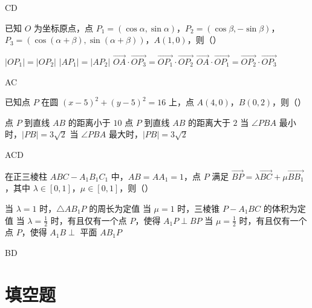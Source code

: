 \begin{answer}
CD
\end{answer}

\begin{problem}
已知 \(O\) 为坐标原点，点 \(P_1=\left( \cos\alpha,\sin\alpha \right)\)，\(P_2=\left( \cos\beta,-\sin\beta \right)\)，\(P_3=\left( \cos\left( \alpha+\beta \right),\sin\left( \alpha+\beta \right) \right)\)，\(A(1,0)\)，则（\quad）

\choices
    {\(|OP_1|=|OP_2|\)}
    {\(|AP_1|=|AP_2|\)}
    {\(\overrightarrow{OA}\cdot\overrightarrow{OP_3}=\overrightarrow{OP_1}\cdot\overrightarrow{OP_2}\)}
    {\(\overrightarrow{OA}\cdot\overrightarrow{OP_1}=\overrightarrow{OP_2}\cdot\overrightarrow{OP_3}\)}
\end{problem}

\begin{answer}
AC
\end{answer}

\begin{problem}
已知点 \(P\) 在圆 \(\left( x-5 \right)^2+\left( y-5 \right)^2=16\) 上，点 \(A(4,0)\)，\(B(0,2)\)，则（\quad）

\choices
    {点 \(P\) 到直线 \(AB\) 的距离小于 \(10\)}
    {点 \(P\) 到直线 \(AB\) 的距离大于 \(2\)}
    {当 \(\angle PBA\) 最小时，\(|PB|=3\sqrt{2}\)}
    {当 \(\angle PBA\) 最大时，\(|PB|=3\sqrt{2}\)}
\end{problem}

\begin{answer}
ACD
\end{answer}

\begin{problem}
在正三棱柱 \(ABC-A_1B_1C_1\) 中，\(AB=AA_1=1\)，点 \(P\) 满足 \(\overrightarrow{BP}=\lambda\overrightarrow{BC}+\mu\overrightarrow{BB_1}\)，其中 \(\lambda\in[0,1]\)，\(\mu\in[0,1]\)，则（\quad）

\choices
    {当 \(\lambda=1\) 时，\(\triangle AB_1P\) 的周长为定值}
    {当 \(\mu=1\) 时，三棱锥 \(P-A_1BC\) 的体积为定值}
    {当 \(\lambda=\frac{1}{2}\) 时，有且仅有一个点 \(P\)，使得 \(A_1P\perp BP\)}
    {当 \(\mu=\frac{1}{2}\) 时，有且仅有一个点 \(P\)，使得 \(A_1B\perp\) 平面 \(AB_1P\)}
\end{problem}

\begin{answer}
BD
\end{answer}

\section{填空题}

